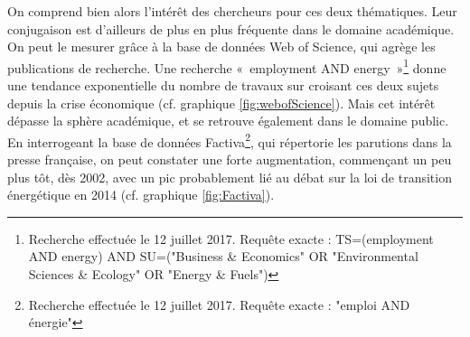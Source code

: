 On comprend bien alors l’intérêt des chercheurs pour ces deux thématiques. Leur conjugaison est d’ailleurs de plus en plus fréquente dans le domaine académique. On peut le mesurer grâce à la base de données Web of Science, qui agrège les publications de recherche. Une recherche  «~employment AND energy~»\footnote{Recherche effectuée le 12 juillet 2017. Requête exacte : TS=(employment AND energy) AND SU=("Business \& Economics" OR "Environmental Sciences \& Ecology" OR "Energy \& Fuels")} donne une tendance exponentielle du nombre de travaux sur croisant ces deux sujets depuis la crise économique (cf. graphique \ref{fig:webofScience}).
Mais cet intérêt dépasse la sphère académique, et se retrouve également dans le domaine public. En interrogeant la base de données Factiva\footnote{Recherche effectuée le 12 juillet 2017. Requête exacte : "emploi AND énergie"}, qui répertorie les parutions dans la presse française, on peut constater une forte augmentation, commençant un peu plus tôt, dès 2002, avec un pic probablement lié au débat sur la loi de transition énergétique en 2014 (cf. graphique \ref{fig:Factiva}). 


\begin{figure}
	\centering
	 \qquad
\end{figure}

